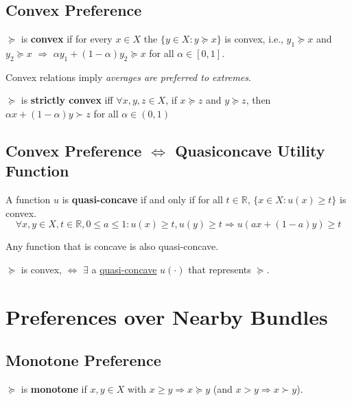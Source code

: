 \documentclass[11pt]{elegantbook}
\begin{document}
\subsection{Convex Preference}
\begin{definition}
    \normalfont
    $\succeq$ is \textbf{convex} if for every $x\in X$ the $\{y\in X: y\succeq x\}$ is convex, i.e., $y_1\succeq x$ and $y_2\succeq x$ $\Rightarrow$ $\alpha y_1+ (1-\alpha) y_2\succeq x$ for all $\alpha\in[0,1]$.
\end{definition}
Convex relations imply \textit{averages are preferred to extremes}.

\begin{definition}
    \normalfont
    $\succeq$ is \textbf{strictly convex} iff $\forall x, y, z \in X$, if $x \succeq z$ and $y \succeq z$, then $\alpha x+(1-\alpha) y \succ z$ for all $\alpha\in (0,1)$
\end{definition}

\subsection{Convex Preference $\Leftrightarrow$ Quasiconcave Utility Function}
\begin{definition}
    \normalfont
    A function $u$ is \textbf{quasi-concave} if and only if for all $t\in \mathbb{R}$, $\{x\in X: u(x)\geq t\}$ is convex.
    $$\forall x, y \in X, t \in \mathbb{R}, 0 \leq a \leq 1: u(x) \geq t, u(y) \geq t \Rightarrow u(a x+(1-a) y) \geq t$$
\end{definition}
\begin{proposition}
    Any function that is concave is also quasi-concave.
\end{proposition}

\begin{proposition}
    $\succeq$ is convex, $\Leftrightarrow$ $\exists$ a \underline{quasi-concave} $u(\cdot)$ that represents $\succeq$.
\end{proposition}

\section{Preferences over Nearby Bundles}
\subsection{Monotone Preference}
\begin{definition}
    \normalfont
    $\succeq$ is \textbf{monotone} if $x,y\in X$ with $x\geq y\Rightarrow x\succeq y$ (and $x> y\Rightarrow x\succ y$).
\end{definition}
\end{document}
